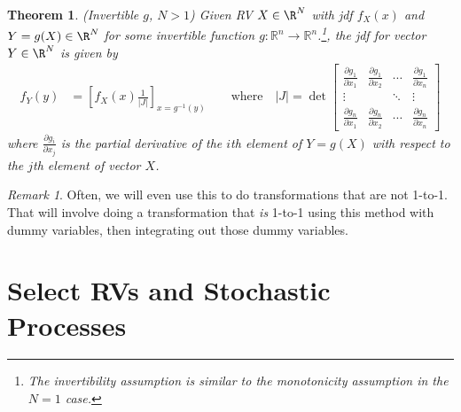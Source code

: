 \documentclass[12pt]{article}
\theoremstyle{plain}
\newtheorem{thm}{Theorem}[section]
\theoremstyle{definition}
\theoremstyle{remark}
\newtheorem*{rmk}{Remark}
\newcommand{\ra}{\rightarrow}
\newcommand{\Rn}{\mathbb{R}^n}
\begin{document}
\begin{thm}\emph{(Invertible $g$, $N>1$)}
\label{thm:transformmultivar}
Given RV $X\in\R^N$ with jdf $f_{X}(x)$ and $Y=g(X)\in\R^N$
for some invertible function $g:\Rn\ra\Rn$.\footnote{%
  The invertibility assumption is similar to the monotonicity assumption
  in the $N=1$ case.
},
the jdf for vector $Y\in\R^N$ is given by
\begin{align*}
  f_{Y}(y)
   &= \left[
      f_{X}(x)\frac{1}{\lvert J\rvert}
      \right]_{x=g^{-1}(y)}
  \qquad\text{where}\quad
  |J| =\det
   \begin{bmatrix} \frac{\partial g_1}{\partial x_1} &
      \frac{\partial g_1}{\partial x_2} & \cdots &
      \frac{\partial g_1}{\partial x_n} \\
      \vdots & & \ddots & \vdots \\
      \frac{\partial g_n}{\partial x_1} &
      \frac{\partial g_n}{\partial x_2} & \cdots &
      \frac{\partial g_n}{\partial x_n}
   \end{bmatrix}
\end{align*}
where $\frac{\partial g_i}{\partial x_j}$ is the partial derivative of
the $i$th element of $Y=g(X)$ with respect to the $j$th element of
vector $X$.
\end{thm}

\begin{rmk}
Often, we will even use this to do transformations that are not
1-to-1. That will involve doing a transformation that \emph{is}
1-to-1 using this method with dummy variables, then integrating
out those dummy variables.
\end{rmk}



\clearpage
\section{Select RVs and Stochastic Processes}
\end{document}
